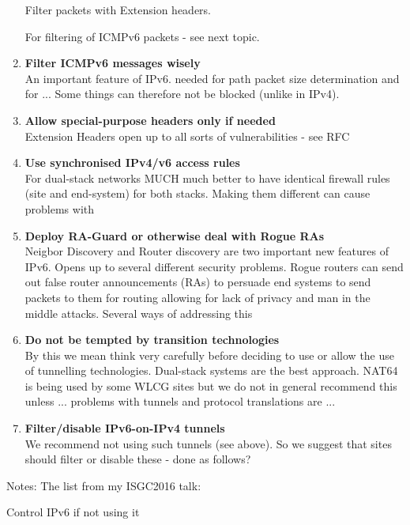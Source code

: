 \begin{enumerate}
Filter packets with Extension headers.

For filtering of ICMPv6 packets - see next topic.


\item {\bf Filter ICMPv6 messages wisely} \\
An important feature of IPv6. needed for path packet size determination and for ...
Some things can therefore not be blocked (unlike in IPv4).

\item {\bf Allow special-purpose headers only if needed} \\
Extension Headers open up to all sorts of vulnerabilities - see RFC

\item {\bf Use synchronised IPv4/v6 access rules} \\
For dual-stack networks MUCH much better to have identical firewall rules (site and end-system) for both stacks. Making them different can cause problems with



\item {\bf Deploy RA-Guard or otherwise deal with Rogue RAs} \\
Neigbor Discovery and Router discovery are two important new features of IPv6. Opens up to several different security problems. Rogue routers can send out false router announcements (RAs) to persuade end systems to send packets to them for routing allowing for lack of privacy and man in the middle attacks.  Several ways of addressing this


\item {\bf Do not be tempted by transition technologies} \\
By this  we mean think very carefully before deciding to use or allow the use of tunnelling technologies.  Dual-stack systems are the best approach. NAT64 is being used by some WLCG sites but we do not in general recommend this unless ...
problems with tunnels and protocol translations are ...

\item {\bf Filter/disable IPv6-on-IPv4 tunnels} \\
We recommend not using such tunnels (see above).  So we suggest that sites should filter or disable these - done as follows?


\end{enumerate}

Notes: The list from my ISGC2016 talk:

Control IPv6 if not using it

